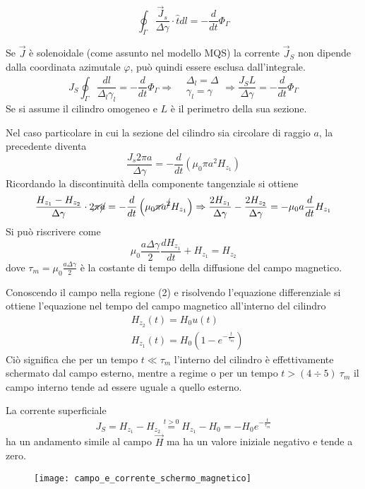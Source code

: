 $$
\oint_\Gamma \frac{\vec{J}_s}{\Delta\gamma} \cdot\hat{t}dl = -\frac{d}{dt} \Phi_\Gamma
$$

Se $\vec{J}$ è solenoidale (come assunto nel modello MQS) la corrente $\vec{J}_S$ non 
dipende dalla coordinata azimutale $\varphi$, può quindi essere esclusa dall'integrale.
$$
J_S\oint_\Gamma\frac{dl}{\Delta_l\gamma_l} = -\frac{d}{dt}\Phi_\Gamma \Rightarrow
\begin{aligned}
&\Delta_l = \Delta\\
&\gamma_l = \gamma
\end{aligned}
\Rightarrow \frac{J_S L}{\Delta\gamma} = -\frac{d}{dt}\Phi_\Gamma
$$
Se si assume il cilindro omogeneo e $L$ è il perimetro della sua sezione.

Nel caso particolare in cui la sezione del cilindro sia circolare di raggio $a$, la precedente diventa
$$
\frac{J_s 2\pi a}{\Delta\gamma} = -\frac{d}{dt}\left(\mu_0\pi a^2 H_{z_1}\right)
$$
Ricordando la discontinuità della componente tangenziale si ottiene
$$
\frac{H_{z_1} - H_{z_2}}{\Delta\gamma}\cdot 2\cancel{\pi} \cancel{a} = -\frac{d}{dt} \left(\mu_0 \cancel{\pi}a^{\cancel{2}}H_{z_1}\right) \Rightarrow \frac{2H_{z_1}}{\Delta\gamma} - \frac{2H_{z_2}}{\Delta\gamma} = -\mu_0 a \frac{d}{dt}H_{z_1}
$$
Si può riscrivere come
$$
\mu_0\frac{a\Delta\gamma}{2}\frac{dH_{z_1}}{dt} + H_{z_1} = H_{z_2}
$$
dove $\tau_m =  \mu_0\frac{a\Delta\gamma}{2}$ è la costante di tempo della diffusione 
del campo magnetico.

Conoscendo il campo nella regione (2) e risolvendo l'equazione differenziale si ottiene 
l'equazione nel tempo del campo magnetico all'interno del cilindro
$$
\begin{aligned}
& H_{z_2}(t) = H_0u(t)\\
& H_{z_1}(t) = H_0\left(1-e^{-\frac{t}{\tau_m}}\right)
\end{aligned}
$$
Ciò significa che per un tempo $t\ll \tau_m$ l'interno del cilindro è effettivamente 
schermato dal campo esterno, mentre a regime o per un tempo $t > (4\div5)\ \tau_m$ il campo
interno tende ad essere uguale a quello esterno.

La corrente superficiale 
$$
J_S = H_{z_1} - H_{z_2} \stackrel{t>0}{=} H_{z_1} - H_0 = -H_0 e^{-\frac{t}{\tau_m}}
$$
ha un andamento simile al campo $\vec{H}$ ma ha un valore iniziale negativo e tende a zero.
\begin{figure}[H]
\centering
\texttt{[image: campo\_e\_corrente\_schermo\_magnetico]}
\end{figure}

